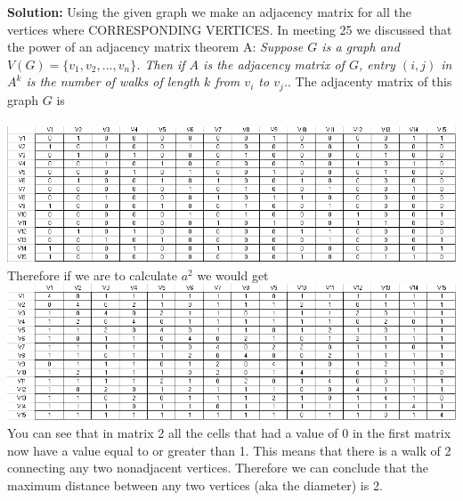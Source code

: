 \documentclass[10pt,a4paper]{report}
\begin{document}
		\noindent\textbf{Solution: }Using the given graph we make an adjacency matrix for all the vertices where CORRESPONDING VERTICES.  In meeting 25 we discussed that the power of an adjacency matrix theorem A: \emph{Suppose $G$ is a graph and $V(G) = \{v_{1}, v_{2}, ..., v_{n}\}$.  Then if $A$ is the adjacency matrix of $G$, entry $(i, j)$ in $A^{k}$ is the number of walks of length $k$ from $v_{i}$ to $v_{j}$.}.  The adjacenty matrix of this graph $G$ is  \\\\
		\includegraphics[scale=.64]{Math3310_Prob6.PNG} \\
		
		\noindent Therefore if we are to calculate $a^{2}$ we would get\\
		
		\noindent\includegraphics[scale=.64]{Math3310_Prob6-1.PNG}\\
		
		\noindent You can see that in matrix 2 all the cells that had a value of 0 in the first matrix now have a value equal to or greater than 1.  This means that there is a walk of 2 connecting any two nonadjacent vertices.  Therefore we can conclude that the maximum distance between any two vertices (aka the diameter) is 2.
		
\end{document}
